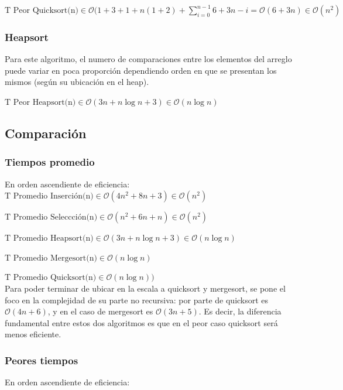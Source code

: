\documentclass[article,a4paper]{article}
\begin{document}
$\mbox{T Peor Quicksort(n)} \in \mathcal O(1 + 3 + 1 + n (1 + 2) + \sum_{i=0}^{n-1} 6+3n-i  = \mathcal O(  6+3n) \in \mathcal O(n^2)$

\subsubsection{Heapsort}

Para este algoritmo, el numero de comparaciones entre los elementos del arreglo puede variar en poca proporción dependiendo orden en que se presentan los mismos (según su ubicación en el heap).

$\mbox{T Peor Heapsort(n)} \in \mathcal O(3n + n \log n + 3) \in \mathcal O(n \log n)$

\subsection{Comparación}

\subsubsection{Tiempos promedio}

En orden ascendiente de eficiencia:\\

$\mbox{T Promedio Inserción(n)} \in \mathcal O(4n^2 + 8n + 3) \in \mathcal O(n^2)$

$\mbox{T Promedio Seleccción(n)} \in \mathcal O(n^2 + 6n + n) \in \mathcal O(n^2)$

$\mbox{T Promedio Heapsort(n)} \in \mathcal O(3n + n \log n + 3) \in \mathcal O(n \log n)$ 

$\mbox{T Promedio Mergesort(n)} \in \mathcal O(n \log n)$ 

$\mbox{T Promedio Quicksort(n)} \in \mathcal O(n \log n))$\\

Para poder terminar de ubicar en la escala a quicksort y mergesort, se pone el foco en la complejidad de su parte no recursiva: por parte de quicksort es $\mathcal O(4n + 6)$, y en el caso de mergesort es $\mathcal O(3n + 5)$. Es decir, la diferencia fundamental entre estos dos algoritmos es que en el peor caso quicksort será menos eficiente.

\subsubsection{Peores tiempos}

En orden ascendiente de eficiencia:\\
\end{document}
